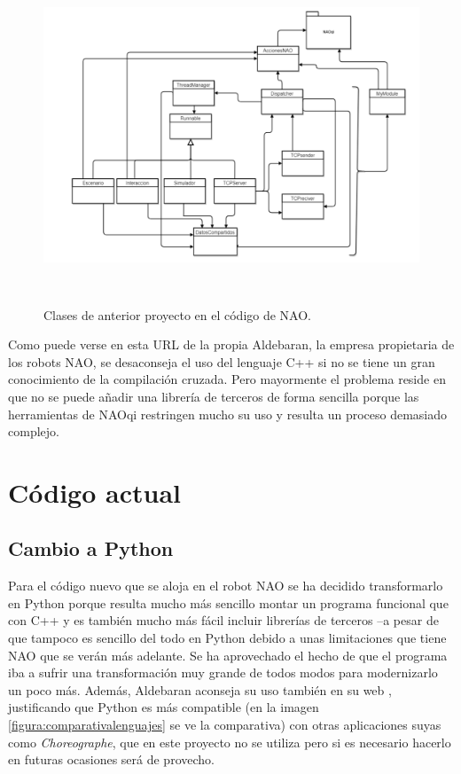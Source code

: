 \documentclass[12pt,spanish,listoffigures,listoftables]{tfgetsinf}
\begin{document}
\begin{figure}[!h]
	\centering
	\includegraphics[height=10cm]{img/clasesnaoprevio}
	\caption{Clases de anterior proyecto en el código de NAO.}
	\label{figura:clasesnaoprevio}
\end{figure}

Como puede verse en esta URL \cite{C++Desaconsejado} de la propia Aldebaran, la empresa propietaria de los robots NAO, se desaconseja el uso del lenguaje C++ si no se tiene un gran conocimiento de la compilación cruzada. Pero mayormente el problema reside en que no se puede añadir una librería de terceros de forma sencilla porque las herramientas de NAOqi restringen mucho su uso y resulta un proceso demasiado complejo.

\section{Código actual}

\subsection{Cambio a Python} \label{CambioPython}

Para el código nuevo que se aloja en el robot NAO se ha decidido transformarlo en Python porque resulta mucho más sencillo montar un programa funcional que con C++ y es también mucho más fácil incluir librerías de terceros --a pesar de que tampoco es sencillo del todo en Python debido a unas limitaciones que tiene NAO que se verán más adelante. Se ha aprovechado el hecho de que el programa iba a sufrir una transformación muy grande de todos modos para modernizarlo un poco más. Además, Aldebaran aconseja su uso también en su web \cite{ProgrammingLanguages}, justificando que Python es más compatible (en la imagen \ref{figura:comparativalenguajes} se ve la comparativa) con otras aplicaciones suyas como \textit{Choreographe}, que en este proyecto no se utiliza pero si es necesario hacerlo en futuras ocasiones será de provecho.
\end{document}
